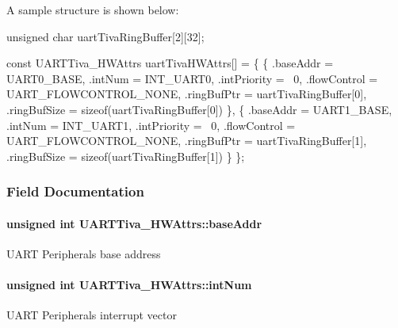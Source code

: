 A sample structure is shown below\+: 
\begin{DoxyCode}
\textcolor{keywordtype}{unsigned} \textcolor{keywordtype}{char} uartTivaRingBuffer[2][32];

\textcolor{keyword}{const} UARTTiva_HWAttrs uartTivaHWAttrs[] = \{
    \{
        .baseAddr = UART0\_BASE,
        .intNum = INT\_UART0,
        .intPriority = ~0,
        .flowControl = UART\_FLOWCONTROL\_NONE,
        .ringBufPtr  = uartTivaRingBuffer[0],
        .ringBufSize = \textcolor{keyword}{sizeof}(uartTivaRingBuffer[0])
    \},
    \{
        .baseAddr = UART1\_BASE,
        .intNum = INT\_UART1,
        .intPriority = ~0,
        .flowControl = UART\_FLOWCONTROL\_NONE,
        .ringBufPtr  = uartTivaRingBuffer[1],
        .ringBufSize = \textcolor{keyword}{sizeof}(uartTivaRingBuffer[1])
    \}
\};
\end{DoxyCode}
 

\subsubsection{Field Documentation}
\paragraph[{base\+Addr}]{\setlength{\rightskip}{0pt plus 5cm}unsigned int U\+A\+R\+T\+Tiva\+\_\+\+H\+W\+Attrs\+::base\+Addr}\label{struct_u_a_r_t_tiva___h_w_attrs_abecf13eceeaf44f1781aa2bfae1edad4}
U\+A\+R\+T Peripheral\textquotesingle{}s base address 
\paragraph[{int\+Num}]{\setlength{\rightskip}{0pt plus 5cm}unsigned int U\+A\+R\+T\+Tiva\+\_\+\+H\+W\+Attrs\+::int\+Num}\label{struct_u_a_r_t_tiva___h_w_attrs_a3353583599880bab5429fcbbd189f89c}
U\+A\+R\+T Peripheral\textquotesingle{}s interrupt vector 
